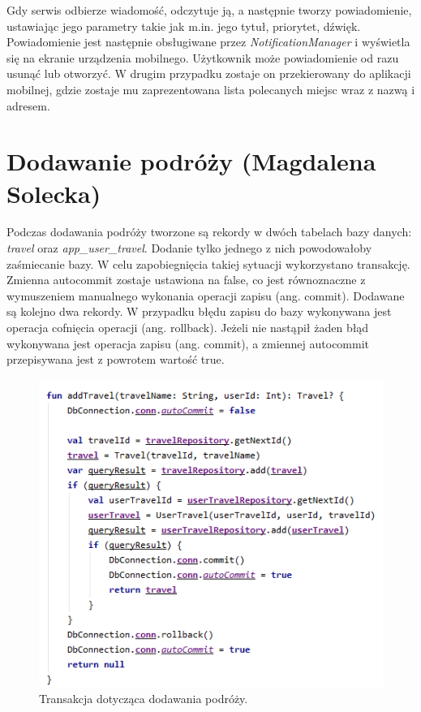 \documentclass[10pt,twoside,a4paper]{report}
\begin{document}
\par Gdy serwis odbierze wiadomość, odczytuje ją, a następnie tworzy powiadomienie, ustawiając jego parametry takie jak m.in. jego tytuł, priorytet, dźwięk. Powiadomienie jest następnie obsługiwane przez \textit{NotificationManager} i wyświetla się na ekranie urządzenia mobilnego. Użytkownik może powiadomienie od razu usunąć lub otworzyć. W drugim przypadku zostaje on przekierowany do aplikacji mobilnej, gdzie zostaje mu zaprezentowana lista polecanych miejsc wraz z nazwą i adresem.

\section{Dodawanie podróży (Magdalena Solecka)}
\par Podczas dodawania podróży tworzone są rekordy w dwóch tabelach bazy danych: \textit{travel} oraz \textit{app\_user\_travel}. Dodanie tylko jednego z nich powodowałoby zaśmiecanie bazy. W celu zapobiegnięcia takiej sytuacji wykorzystano transakcję. Zmienna autocommit zostaje ustawiona na false, co jest równoznaczne z wymuszeniem manualnego wykonania operacji zapisu (ang. commit). Dodawane są kolejno dwa rekordy. W przypadku błędu zapisu do bazy wykonywana jest operacja cofnięcia operacji (ang. rollback). Jeżeli nie nastąpił żaden błąd wykonywana jest operacja zapisu (ang. commit), a zmiennej autocommit przepisywana jest z powrotem wartość true.

\begin{figure}[h]
\centering
\includegraphics[width=\linewidth]{travelTransaction}
\caption{Transakcja dotycząca dodawania podróży.}
\label{fig:travelTransaction}
\end{figure}
\FloatBarrier
\end{document}
